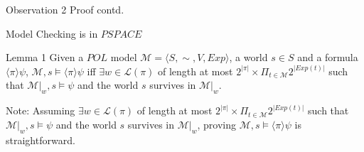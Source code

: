 \documentclass{beamer}
\newcommand\ldiaarg[1]{\langle#1\rangle}
\newcommand{\M}{\mathcal{M}}
\newcommand{\LL}{\mathcal{L}} %
\begin{document}
\begin{frame}{Observation 2 Proof contd.}
    
\end{frame}

\begin{frame}{Model Checking is in $PSPACE$}
    \begin{block}{Lemma 1}
    Given a $POL$ model $\M=\langle S,\sim,V,Exp\rangle$, a world $s\in S$ and a formula $\ldiaarg{\pi}\psi$, $\M,s\vDash\ldiaarg{\pi}\psi$ iff $\exists w\in \LL(\pi)$ of length at most $2^{|\pi|}\times \Pi_{t \in \M} 2^{|Exp(t)|}$ such that $\M|_w,s\vDash\psi$ and the world $s$ survives in $\M|_w$.
    \end{block}\pause
    Note: Assuming $\exists w\in \LL(\pi)$ of length at most $2^{|\pi|}\times \Pi_{t \in \M} 2^{|Exp(t)|}$ such that $\M|_w,s\vDash\psi$ and the world $s$ survives in $\M|_w$, proving $\M,s\vDash\ldiaarg{\pi}\psi$ is straightforward.
\end{frame}
\end{document}
